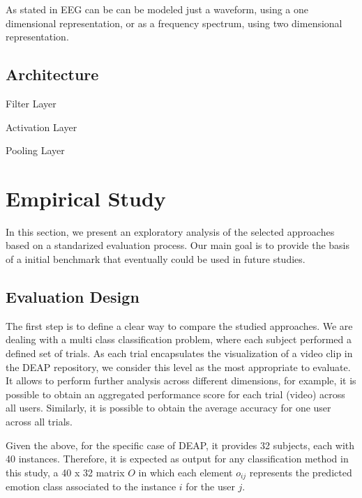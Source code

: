 \documentclass{sig-alternate}
\begin{document}
As stated in \cite{stober2014using} EEG can be can be modeled 
just a waveform, using a one
dimensional representation, or as a frequency spectrum, using 
two dimensional representation.

\subsection{Architecture}

Filter Layer 

Activation Layer
 
Pooling Layer



\cite{lecun1995convolutional}
\cite{zheng2014time}

\cite{stober2014classifying}
\cite{xing2010brief}

\section{Empirical Study}
\label{study}

In this section, we present an  exploratory 
analysis of the selected approaches based on a standarized
evaluation process. Our main goal is to provide the basis
of a initial benchmark that eventually could be used in future
studies.

\subsection{ Evaluation Design} 

The first step is to define a clear way to compare the 
studied approaches. We are dealing with a multi class classification
problem, where  each subject performed a defined set of trials. As
each trial encapsulates the visualization of a video clip in the DEAP 
repository, we consider
this level as the most appropriate to evaluate. It allows to perform 
further analysis across different dimensions, for example, it is possible
to obtain an aggregated performance score for each  trial (video) across all users. Similarly, it is possible to obtain the average accuracy for one 
user across all trials.

Given the above,  for the specific case of DEAP, it provides 32 subjects, 
each with 40 instances. Therefore, it is expected as output for any classification method in this study, a  40 x 32 matrix  $O$ in  which each element $o_{ij}$ represents the predicted emotion class associated to the instance $i$ for the user $j$.
 
\end{document}
